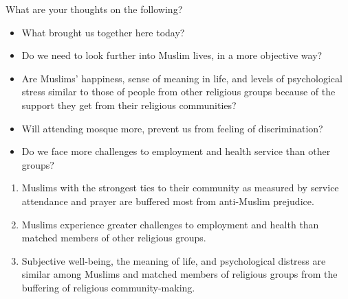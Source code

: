 \documentclass[
  ignorenonframetext,
  aspectratio=169,
]{beamer}
\providecommand{\tightlist}{%
  \setlength{\itemsep}{0pt}\setlength{\parskip}{0pt}}\usepackage{longtable,booktabs,array}
\begin{document}
\begin{frame}{What are your thoughts on the following?}
\label{what-are-your-thoughts-on-the-following}
\begin{itemize}[<+->]
\tightlist
\item
  What brought us together here today?
\item
  Do we need to look further into Muslim lives, in a more objective way?
\item
  Are Muslims' happiness, sense of meaning in life, and levels of
  psychological stress similar to those of people from other religious
  groups because of the support they get from their religious
  communities?
\item
  Will attending mosque more, prevent us from feeling of discrimination?
\item
  Do we face more challenges to employment and health service than other
  groups?
\end{itemize}
\end{frame}

\begin{frame}
\begin{enumerate}
\item
  Muslims with the strongest ties to their community as measured by
  service attendance and prayer are buffered most from anti-Muslim
  prejudice.
\item
  Muslims experience greater challenges to employment and health than
  matched members of other religious groups.
\item
  Subjective well-being, the meaning of life, and psychological distress
  are similar among Muslims and matched members of religious groups from
  the buffering of religious community-making.
\end{enumerate}
\end{frame}
\end{document}
